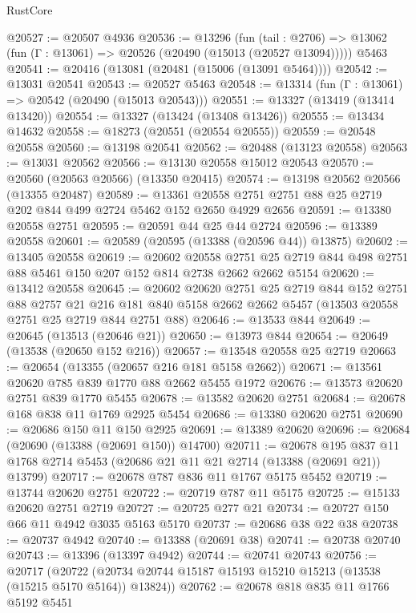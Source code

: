 \begin{lexlean}{RustCore}
\begin{coremodule}
@20527 := @20507 @4936
@20536 := @13296
    (fun (tail : @2706) => @13062 (fun (Γ : @13061) => @20526 (@20490 (@15013 (@20527 @13094)))))
    @5463
@20541 := @20416 (@13081 (@20481 (@15006 (@13091 @5464))))
@20542 := @13031 @20541
@20543 := @20527 @5463
@20548 := @13314 (fun (Γ : @13061) => @20542 (@20490 (@15013 @20543)))
@20551 := @13327 (@13419 (@13414 @13420))
@20554 := @13327 (@13424 (@13408 @13426))
@20555 := @13434 @14632
@20558 := @18273 (@20551 (@20554 @20555))
@20559 := @20548 @20558
@20560 := @13198 @20541
@20562 := @20488 (@13123 @20558)
@20563 := @13031 @20562
@20566 := @13130 @20558 @15012 @20543
@20570 := @20560 (@20563 @20566) (@13350 @20415)
@20574 := @13198 @20562 @20566 (@13355 @20487)
@20589 := @13361 @20558 @2751 @2751 @88 @25 @2719 @202 @844 @499 @2724 @5462 @152 @2650 @4929 @2656
@20591 := @13380 @20558 @2751
@20595 := @20591 @44 @25 @44 @2724
@20596 := @13389 @20558
@20601 := @20589 (@20595 (@13388 (@20596 @44)) @13875)
@20602 := @13405 @20558
@20619 := @20602
    @20558
    @2751
    @25
    @2719
    @844
    @498
    @2751
    @88
    @5461
    @150
    @207
    @152
    @814
    @2738
    @2662
    @2662
    @5154
@20620 := @13412 @20558
@20645 := @20602
    @20620
    @2751
    @25
    @2719
    @844
    @152
    @2751
    @88
    @2757
    @21
    @216
    @181
    @840
    @5158
    @2662
    @2662
    @5457
    (@13503 @20558 @2751 @25 @2719 @844 @2751 @88)
@20646 := @13533 @844
@20649 := @20645 (@13513 (@20646 @21))
@20650 := @13973 @844
@20654 := @20649 (@13538 (@20650 @152 @216))
@20657 := @13548 @20558 @25 @2719
@20663 := @20654 (@13355 (@20657 @216 @181 @5158 @2662))
@20671 := @13561 @20620 @785 @839 @1770 @88 @2662 @5455 @1972
@20676 := @13573 @20620 @2751 @839 @1770 @5455
@20678 := @13582 @20620 @2751
@20684 := @20678 @168 @838 @11 @1769 @2925 @5454
@20686 := @13380 @20620 @2751
@20690 := @20686 @150 @11 @150 @2925
@20691 := @13389 @20620
@20696 := @20684 (@20690 (@13388 (@20691 @150)) @14700)
@20711 := @20678
    @195
    @837
    @11
    @1768
    @2714
    @5453
    (@20686 @21 @11 @21 @2714 (@13388 (@20691 @21)) @13799)
@20717 := @20678 @787 @836 @11 @1767 @5175 @5452
@20719 := @13744 @20620 @2751
@20722 := @20719 @787 @11 @5175
@20725 := @15133 @20620 @2751 @2719
@20727 := @20725 @277 @21
@20734 := @20727 @150 @66 @11 @4942 @3035 @5163 @5170
@20737 := @20686 @38 @22 @38
@20738 := @20737 @4942
@20740 := @13388 (@20691 @38)
@20741 := @20738 @20740
@20743 := @13396 (@13397 @4942)
@20744 := @20741 @20743
@20756 := @20717
    (@20722 (@20734 @20744 @15187 @15193 @15210 @15213 (@13538 (@15215 @5170 @5164)) @13824))
@20762 := @20678 @818 @835 @11 @1766 @5192 @5451

\end{coremodule}
\end{lexlean}
